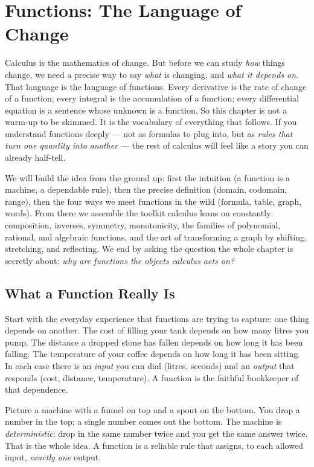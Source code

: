 \chapter{Functions: The Language of Change}

Calculus is the mathematics of change. But before we can study \emph{how} things
change, we need a precise way to say \emph{what} is changing, and \emph{what it
depends on}. That language is the language of functions. Every derivative is the
rate of change of a function; every integral is the accumulation of a function;
every differential equation is a sentence whose unknown is a function. So this
chapter is not a warm-up to be skimmed. It is the vocabulary of everything that
follows. If you understand functions deeply --- not as formulas to plug into, but
as \emph{rules that turn one quantity into another} --- the rest of calculus will
feel like a story you can already half-tell.

We will build the idea from the ground up: first the intuition (a function is a
machine, a dependable rule), then the precise definition (domain, codomain,
range), then the four ways we meet functions in the wild (formula, table, graph,
words). From there we assemble the toolkit calculus leans on constantly:
composition, inverses, symmetry, monotonicity, the families of polynomial,
rational, and algebraic functions, and the art of transforming a graph by
shifting, stretching, and reflecting. We end by asking the question the whole
chapter is secretly about: \emph{why are functions the objects calculus acts on?}

\section{What a Function Really Is}
\label{ch02:what-is-a-function}

Start with the everyday experience that functions are trying to capture: one
thing depends on another. The cost of filling your tank depends on how many
litres you pump. The distance a dropped stone has fallen depends on how long it
has been falling. The temperature of your coffee depends on how long it has been
sitting. In each case there is an \emph{input} you can dial (litres, seconds) and
an \emph{output} that responds (cost, distance, temperature). A function is the
faithful bookkeeper of that dependence.

\begin{intuitionbox}
Picture a machine with a funnel on top and a spout on the bottom. You drop a
number in the top; a single number comes out the bottom. The machine is
\emph{deterministic}: drop in the same number twice and you get the same answer
twice. That is the whole idea. A function is a reliable rule that assigns, to each
allowed input, \emph{exactly one} output.
\end{intuitionbox}

